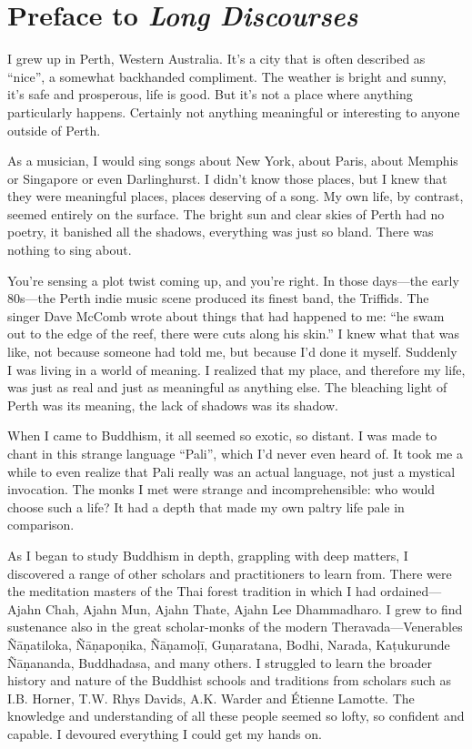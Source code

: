 \documentclass[12pt,openany]{book}%
\begin{document}
%
\chapter*{Preface to \emph{Long Discourses}}

I grew up in Perth, Western Australia. It’s a city that is often described as “nice”, a somewhat backhanded compliment. The weather is bright and sunny, it’s safe and prosperous, life is good. But it’s not a place where anything particularly happens. Certainly not anything meaningful or interesting to anyone outside of Perth.

As a musician, I would sing songs about New York, about Paris, about Memphis or Singapore or even Darlinghurst. I didn’t know those places, but I knew that they were meaningful places, places deserving of a song. My own life, by contrast, seemed entirely on the surface. The bright sun and clear skies of Perth had no poetry, it banished all the shadows, everything was just so bland. There was nothing to sing about.

You’re sensing a plot twist coming up, and you’re right. In those days—the early 80s—the Perth indie music scene produced its finest band, the Triffids. The singer Dave McComb wrote about things that had happened to me: “he swam out to the edge of the reef, there were cuts along his skin.” I knew what that was like, not because someone had told me, but because I’d done it myself. Suddenly I was living in a world of meaning. I realized that my place, and therefore my life, was just as real and just as meaningful as anything else. The bleaching light of Perth was its meaning, the lack of shadows was its shadow.

When I came to Buddhism, it all seemed so exotic, so distant. I was made to chant in this strange language “Pali”, which I’d never even heard of. It took me a while to even realize that Pali really was an actual language, not just a mystical invocation. The monks I met were strange and incomprehensible: who would choose such a life? It had a depth that made my own paltry life pale in comparison.

As I began to study Buddhism in depth, grappling with deep matters, I discovered a range of other scholars and practitioners to learn from. There were the meditation masters of the Thai forest tradition in which I had ordained—Ajahn Chah, Ajahn Mun, Ajahn Thate, Ajahn Lee Dhammadharo. I grew to find sustenance also in the great scholar-monks of the modern Theravada—Venerables \textsanskrit{Ñāṇatiloka}, \textsanskrit{Ñāṇapoṇika}, \textsanskrit{Ñāṇamoḷī}, \textsanskrit{Guṇaratana}, Bodhi, Narada, \textsanskrit{Kaṭukurunde} \textsanskrit{Ñāṇananda}, Buddhadasa, and many others. I struggled to learn the broader history and nature of the Buddhist schools and traditions from scholars such as I.B. Horner, T.W. Rhys Davids, A.K. Warder and Étienne Lamotte. The knowledge and understanding of all these people seemed so lofty, so confident and capable. I devoured everything I could get my hands on.
\end{document}
